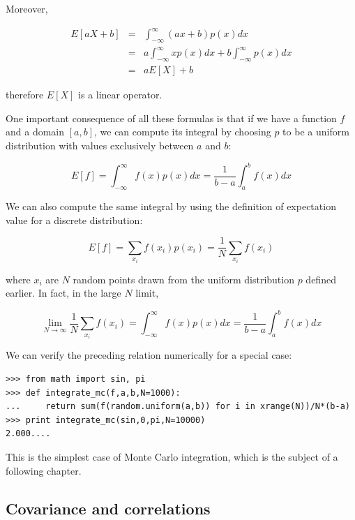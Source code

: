 \documentclass[justified,sixbynine]{tufte-book}
\def\ft{\small\tt}
\theoremstyle{plain}%
\theoremstyle{definition}
\theoremstyle{remark}
\begin{document}
\begin{fullwidth}
Moreover,

\begin{eqnarray}
E[aX+b] &=&\int_{-\infty }^\infty (ax+b)p(x)dx \\
&=&a\int_{-\infty }^\infty xp(x)dx+b\int_{-\infty }^\infty p(x)dx \\
&=&aE[X]+b
\end{eqnarray}

therefore $E[X]$ is a linear operator.

One important consequence of all these formulas is that if we have a function $f$ and a domain $[a,b]$, we can compute its integral by choosing $p$ to be a uniform distribution with values exclusively between $a$ and $b$:

\begin{equation}
  E[f] = \int_{-\infty }^\infty f(x) p(x) dx = \frac1{b-a}\int_a^b f(x) dx
\end{equation}

We can also compute the same integral by using the definition of expectation value for a discrete distribution:

\begin{equation}
  E[f] = \sum_{x_i} f(x_i) p(x_i) = \frac1N \sum_{x_i} f(x_i)
\end{equation}

where $x_i$ are $N$ random points drawn from the uniform distribution $p$ defined earlier. In fact, in the large $N$ limit,

\begin{equation}
  \lim_{N\rightarrow \infty}  \frac1N \sum_{x_i} f(x_i) = \int_{-\infty }^\infty f(x) p(x)dx = \frac1{b-a}\int_a^b f(x) dx
\end{equation}

We can verify the preceding relation numerically for a special case:

\begin{lstlisting}[caption={in file: {\ft nlib.py}}]
>>> from math import sin, pi
>>> def integrate_mc(f,a,b,N=1000):
...     return sum(f(random.uniform(a,b)) for i in xrange(N))/N*(b-a)
>>> print integrate_mc(sin,0,pi,N=10000)
2.000....
\end{lstlisting}

This is the simplest case of Monte Carlo integration, which is the subject of a following chapter.

\goodbreak\subsection{Covariance and correlations}


\end{fullwidth}
\end{document}
